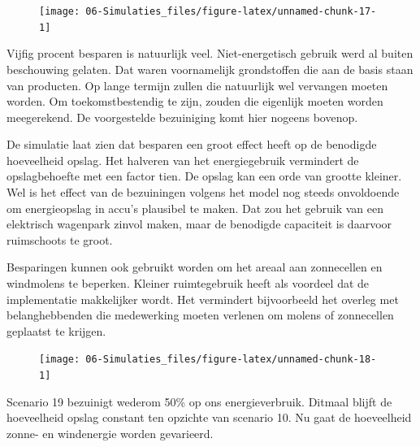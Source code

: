 \documentclass[
  11pt,
  a4paper,
]{book}
\begin{document}
\begin{figure}

{\centering \texttt{[image: 06-Simulaties\_files/figure-latex/unnamed-chunk-17-1]} 

}

\end{figure}

Vijfig procent besparen is natuurlijk veel. Niet-energetisch gebruik werd al buiten beschouwing gelaten. Dat waren voornamelijk grondstoffen die aan de basis staan van producten. Op lange termijn zullen die natuurlijk wel vervangen moeten worden. Om toekomstbestendig te zijn, zouden die eigenlijk moeten worden meegerekend. De voorgestelde bezuiniging komt hier nogeens bovenop.

De simulatie laat zien dat besparen een groot effect heeft op de benodigde hoeveelheid opslag. Het halveren van het energiegebruik vermindert de opslagbehoefte met een factor tien. De opslag kan een orde van grootte kleiner. Wel is het effect van de bezuiningen volgens het model nog steeds onvoldoende om energieopslag in accu's plausibel te maken. Dat zou het gebruik van een elektrisch wagenpark zinvol maken, maar de benodigde capaciteit is daarvoor ruimschoots te groot.

\bigskip\noindent
Besparingen kunnen ook gebruikt worden om het areaal aan zonnecellen en windmolens te beperken. Kleiner ruimtegebruik heeft als voordeel dat de implementatie makkelijker wordt. Het vermindert bijvoorbeeld het overleg met belanghebbenden die medewerking moeten verlenen om molens of zonnecellen geplaatst te krijgen.

\begin{figure}

{\centering \texttt{[image: 06-Simulaties\_files/figure-latex/unnamed-chunk-18-1]} 

}

\end{figure}

Scenario 19 bezuinigt wederom 50\% op ons energieverbruik. Ditmaal blijft de hoeveelheid opslag constant ten opzichte van scenario 10. Nu gaat de hoeveelheid zonne- en windenergie worden gevarieerd.
\end{document}
